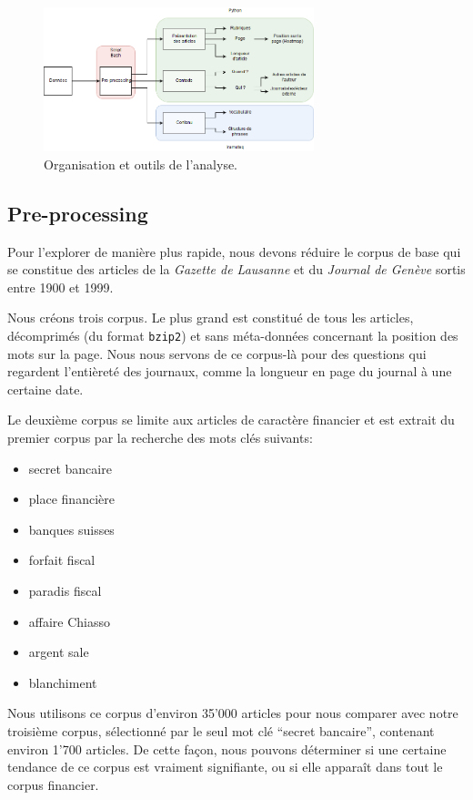 \documentclass[a4paper, 11pt]{article}
\begin{document}
\begin{figure}
\centering
\includegraphics[width=0.7\textwidth]{methodology/methods.png}
\caption{Organisation et outils de l'analyse.}
\label{methods}
\end{figure}

\hypertarget{pre-processing}{%
\subsection{Pre-processing}\label{pre-processing}}

Pour l'explorer de manière plus rapide, nous devons réduire le corpus de
base qui se constitue des articles de la \emph{Gazette de Lausanne}
et du \emph{Journal de Genève} sortis entre 1900 et 1999.

Nous créons trois corpus. Le plus grand est constitué de tous les
articles, décomprimés (du format \texttt{bzip2}) et sans méta-données
concernant la position des mots sur la page. Nous nous servons de ce
corpus-là pour des questions qui regardent l'entièreté des journaux,
comme la longueur en page du journal à une certaine date.

Le deuxième corpus se limite aux articles de caractère financier et est
extrait du premier corpus par la recherche des mots clés suivants:

\begin{itemize}
\item
  secret bancaire
\item
  place financière
\item
  banques suisses
\item
  forfait fiscal
\item
  paradis fiscal
\item
  affaire Chiasso
\item
  argent sale
\item
  blanchiment
\end{itemize}

Nous utilisons ce corpus d'environ 35'000 articles pour nous
comparer avec notre troisième corpus, sélectionné par le seul mot clé
``secret bancaire'', contenant environ 1'700 articles. De cette façon,
nous pouvons déterminer si une certaine tendance de ce corpus est
vraiment signifiante, ou si elle apparaît dans tout le corpus financier.
\end{document}
